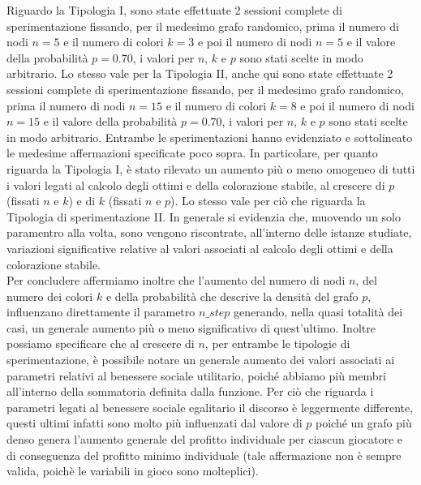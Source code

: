 Riguardo la Tipologia I, sono state effettuate 2 sessioni complete di sperimentazione fissando, per il medesimo grafo randomico, prima il numero di nodi $n=5$ e il numero di colori $k=3$ e poi il numero di nodi $n=5$ e il valore della probabilità $p=0.70$, i valori per $n$, $k$ e $p$ sono stati scelte in modo arbitrario. Lo stesso vale per la Tipologia II, anche qui sono state effettuate 2 sessioni complete di sperimentazione fissando, per il medesimo grafo randomico, prima il numero di nodi $n=15$ e il numero di colori $k=8$ e poi il numero di nodi $n=15$ e il valore della probabilità $p=0.70$, i valori per $n$, $k$ e $p$ sono stati scelte in modo arbitrario. Entrambe le sperimentazioni hanno evidenziato e sottolineato le medesime affermazioni specificate poco sopra. In particolare, per quanto riguarda la Tipologia I, è stato rilevato un aumento più o meno omogeneo di tutti i valori legati al calcolo degli ottimi e della colorazione stabile, al crescere di $p$ (fissati $n$ e $k$) e di $k$ (fissati $n$ e $p$). Lo stesso vale per ciò che riguarda la Tipologia di sperimentazione II. In generale si evidenzia che, muovendo un solo paramentro alla volta, sono vengono riscontrate, all'interno delle istanze studiate, variazioni significative relative al valori associati al calcolo degli ottimi e della colorazione stabile.\\
Per concludere affermiamo inoltre che l'aumento del numero di nodi $n$, del numero dei colori $k$ e della probabilità che descrive la densità del grafo $p$, influenzano direttamente il parametro $n\_step$ generando, nella quasi totalità dei casi, un generale aumento più o meno significativo di quest'ultimo. Inoltre possiamo specificare che al crescere di $n$, per entrambe le tipologie di sperimentazione, è possibile notare un generale aumento dei valori associati ai parametri relativi al benessere sociale utilitario, poiché abbiamo più membri all'interno della sommatoria definita dalla funzione. Per ciò che riguarda i parametri legati al benessere sociale egalitario il discorso è leggermente differente, questi ultimi infatti sono molto più influenzati dal valore di $p$ poiché un grafo più denso genera l'aumento generale del profitto individuale per ciascun giocatore e di conseguenza del profitto minimo individuale (tale affermazione non è sempre valida, poichè le variabili in gioco sono molteplici).\\ 

